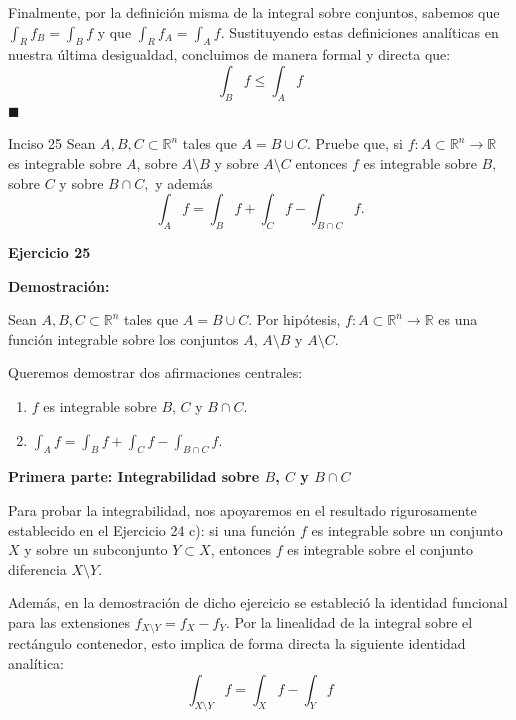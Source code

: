 \documentclass[11pt,letterpaper]{article}
\begin{document}
Finalmente, por la definición misma de la integral sobre conjuntos, sabemos que $\int_R f_B = \int_B f$ y que $\int_R f_A = \int_A f$. Sustituyendo estas definiciones analíticas en nuestra última desigualdad, concluimos de manera formal y directa que:
\begin{equation*}
\int_B f \le \int_A f
\end{equation*}
\hfill $\blacksquare$

\begin{inciso}{Inciso 25}
Sean $A, B, C\subset\mathbb{R}^{n}$ tales que $A=B\cup C$. Pruebe que, si $f:A\subset\mathbb{R}^{n}\rightarrow\mathbb{R}$ es integrable sobre $A$, sobre $A\setminus B$ y sobre $A\setminus C$ entonces $f$ es integrable sobre $B,$ sobre $C$ y sobre $B\cap C,$ y además
\begin{equation*}
    \int_{A}f=\int_{B}f+\int_{C}f-\int_{B\cap C}f.
\end{equation*}
\end{inciso}

\textbf{Ejercicio 25}

\textbf{Demostración:}

Sean $A, B, C \subset \mathbb{R}^n$ tales que $A = B \cup C$. Por hipótesis, $f: A \subset \mathbb{R}^n \rightarrow \mathbb{R}$ es una función integrable sobre los conjuntos $A$, $A \setminus B$ y $A \setminus C$. 

Queremos demostrar dos afirmaciones centrales:
\begin{enumerate}
    \item $f$ es integrable sobre $B$, $C$ y $B \cap C$.
    \item $\int_A f = \int_B f + \int_C f - \int_{B \cap C} f$.
\end{enumerate}

\vspace{0.5cm}
\textbf{Primera parte: Integrabilidad sobre $B$, $C$ y $B \cap C$}

Para probar la integrabilidad, nos apoyaremos en el resultado rigurosamente establecido en el Ejercicio 24 c): si una función $f$ es integrable sobre un conjunto $X$ y sobre un subconjunto $Y \subset X$, entonces $f$ es integrable sobre el conjunto diferencia $X \setminus Y$. 

Además, en la demostración de dicho ejercicio se estableció la identidad funcional para las extensiones $f_{X \setminus Y} = f_X - f_Y$. Por la linealidad de la integral sobre el rectángulo contenedor, esto implica de forma directa la siguiente identidad analítica:
\begin{equation*}
\int_{X \setminus Y} f = \int_X f - \int_Y f
\end{equation*}
\end{document}
